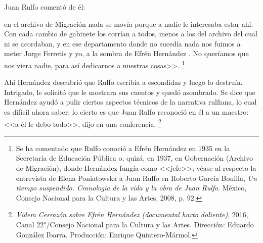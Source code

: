 \documentclass[14pt,twoside,final]{extbook} %
\let\oldfootnote\footnote
\renewcommand\footnote[1]{%
\oldfootnote{\hspace{1mm}#1}}
\begin{document}
Juan Rulfo comentó de él:
\begin{quoting}
en el archivo de Migración nada se movía porque a nadie le interesaba estar ahí. Con cada cambio de gabinete los corrían a todos, menos a los del archivo del cual ni se acordaban, y en ese departamento donde no sucedía nada nos fuimos a meter Jorge Ferretis y yo, a la sombra de Efrén Hernández . No queríamos que nos viera nadie, para así dedicarnos a nuestras cosas>>.\footnote{Se ha comentado que Rulfo conoció a Efrén Hernández en 1935 en la Secretaría de Educación Pública o, quizá, en 1937, en Gobernación (Archivo de Migración), donde Hernández fungía como <<jefe>>; véase al respecto la entrevista de Elena Poniatowska a Juan Rulfo en Roberto García Bonilla, \emph{Un tiempo suspendido. Cronología de la vida y la obra de Juan Rulfo}. México, Consejo Nacional para la Cultura y las Artes, 2008, p. 92.}
\end{quoting}
Ahí Hernández descubrió que Rulfo escribía a escondidas y luego lo destruía. Intrigado, le solicitó que le mostrara sus cuentos y quedó asombrado. Se dice que
Hernández ayudó a pulir ciertos aspectos técnicos de la narrativa rulfiana, lo cual es difícil ahora saber; lo cierto es que Juan Rulfo reconoció en él a un maestro: <<a él le debo todo>>, dijo en una conferencia.\footnote{\emph{Videm} \emph{Cerrazón sobre Efrén Hernández (documental harto doliente)}, 2016, Canal 22"/Consejo Nacional para la Cultura y las Artes. Dirección: Eduardo González Ibarra. Producción: Enrique Quintero-Mármol.}
\end{document}
